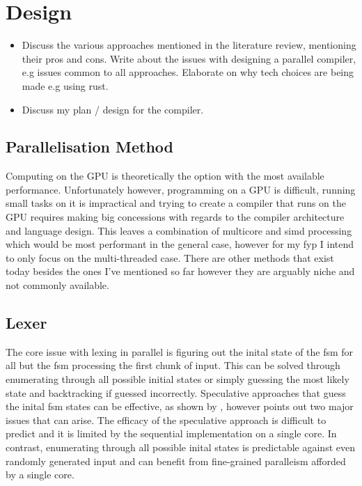 \chapter{Design} \label{design}
\begin{sectionplan}
\begin{itemize}
	\item Discuss the various approaches mentioned in the literature review, mentioning
		  their pros and cons. Write about the issues with designing a parallel compiler,
		  e.g issues common to all approaches. Elaborate on why tech choices are being
		  made e.g using rust. 
	\item Discuss my plan / design for the compiler.
\end{itemize}


\end{sectionplan}

\section{Parallelisation Method} \label{design_parallel_method}

Computing on the GPU is theoretically the option with the most available
performance. Unfortunately however, programming on a GPU is difficult, running
small tasks on it is impractical and trying to create a compiler that runs
on the GPU requires making big concessions with regards to the compiler
architecture and language design. This leaves a combination of multicore and
\gls{simd} processing which would be most performant in the general case,
however for my \gls{fyp} I intend to only focus on the multi-threaded case.
There are other methods that exist today besides the ones I’ve mentioned so far
however they are arguably niche and not commonly available.

\section{Lexer} \label{lexer}

The core issue with lexing in parallel is figuring out the inital state
of the \gls{fsm} for all but the \gls{fsm} processing the first chunk of
input. This can be solved through enumerating through all possible initial
states or simply guessing the most likely state and backtracking if guessed
incorrectly. Speculative approaches that guess the inital \gls{fsm} states
can be effective, as shown by \cite{luchaup_speculative_2011}, however
\cite{mytkowicz_data-parallel_2014} points out two major issues that can
arise. The efficacy of the speculative approach is difficult to predict and
it is limited by the sequential implementation on a single core. In contrast,
enumerating through all possible inital states is predictable against even
randomly generated input and can benefit from fine-grained paralleism afforded
by a single core.

